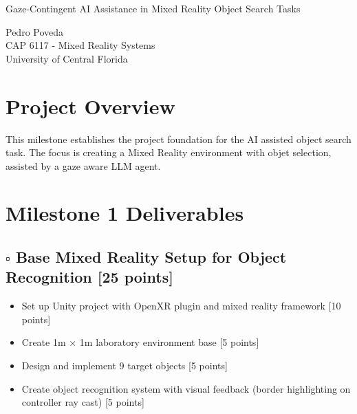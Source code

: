 \documentclass[12pt,letterpaper]{article}
\newcommand{\taskbox}{$\square$}
\begin{document}
\begin{center}
{\Huge\bfseries\color{black}{Milestone 1 Project Checklist}}

\vspace{0.5cm}

{\Large Gaze-Contingent AI Assistance in Mixed Reality Object Search Tasks}

\vspace{0.3cm}

{\large Pedro Poveda}\\
{\normalsize CAP 6117 - Mixed Reality Systems}\\
{\normalsize University of Central Florida}

\vspace{0.5cm}

\end{center}

\section{Project Overview}
This milestone establishes the project foundation for the AI assisted object search task. The focus is creating a Mixed Reality environment with objet selection, assisted by a gaze aware LLM agent.

\section{Milestone 1 Deliverables}

\subsection{\taskbox \hspace{0.2cm} Base Mixed Reality Setup for Object Recognition \hfill {\color{successgreen}\bfseries [25 points]}}

\begin{itemize}[leftmargin=1cm, itemsep=0.3cm]
    \item[\taskbox] Set up Unity project with OpenXR plugin and mixed reality framework \hfill {\small [10 points]}
    \item[\taskbox] Create 1m × 1m laboratory environment base \hfill {\small [5 points]}
    \item[\taskbox] Design and implement 9 target objects \hfill {\small [5 points]}
    \item[\taskbox] Create object recognition system with visual feedback (border highlighting on controller ray cast) \hfill {\small [5 points]}
\end{itemize}
\end{document}
